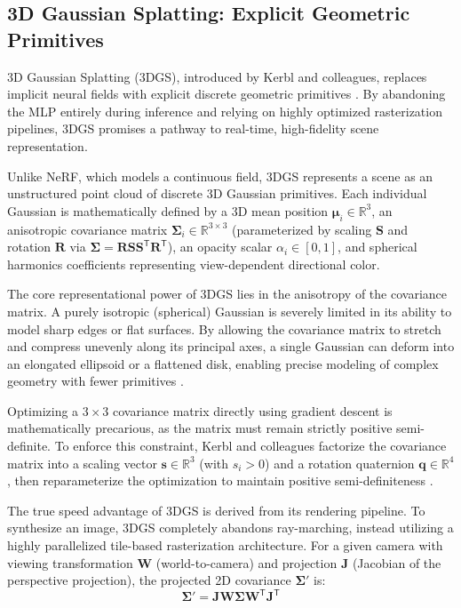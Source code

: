 \documentclass[12pt,a4paper,oneside]{report}
\begin{document}
\subsection{3D Gaussian Splatting: Explicit Geometric Primitives}
\label{subsec:3d_gaussian_splatting_explicit_geometric_primitives}

3D Gaussian Splatting (3DGS), introduced by Kerbl and colleagues, replaces implicit neural fields with explicit discrete geometric primitives \cite{kerbl20233d}. By abandoning the MLP entirely during inference and relying on highly optimized rasterization pipelines, 3DGS promises a pathway to real-time, high-fidelity scene representation.

Unlike NeRF, which models a continuous field, 3DGS represents a scene as an unstructured point cloud of discrete 3D Gaussian primitives. Each individual Gaussian is mathematically defined by a 3D mean position $\boldsymbol{\mu}_i \in \mathbb{R}^3$, an anisotropic covariance matrix $\boldsymbol{\Sigma}_i \in \mathbb{R}^{3 \times 3}$ (parameterized by scaling $\mathbf{S}$ and rotation $\mathbf{R}$ via $\boldsymbol{\Sigma} = \mathbf{R} \mathbf{S} \mathbf{S}^\mathsf{T} \mathbf{R}^\mathsf{T}$), an opacity scalar $\alpha_i \in [0, 1]$, and spherical harmonics coefficients representing view-dependent directional color.

The core representational power of 3DGS lies in the anisotropy of the covariance matrix. A purely isotropic (spherical) Gaussian is severely limited in its ability to model sharp edges or flat surfaces. By allowing the covariance matrix to stretch and compress unevenly along its principal axes, a single Gaussian can deform into an elongated ellipsoid or a flattened disk, enabling precise modeling of complex geometry with fewer primitives \cite{kerbl20233d}.

Optimizing a $3 \times 3$ covariance matrix directly using gradient descent is mathematically precarious, as the matrix must remain strictly positive semi-definite. To enforce this constraint, Kerbl and colleagues factorize the covariance matrix into a scaling vector $\mathbf{s} \in \mathbb{R}^3$ (with $s_i > 0$) and a rotation quaternion $\mathbf{q} \in \mathbb{R}^4$, then reparameterize the optimization to maintain positive semi-definiteness \cite{kerbl20233d}.

The true speed advantage of 3DGS is derived from its rendering pipeline. To synthesize an image, 3DGS completely abandons ray-marching, instead utilizing a highly parallelized tile-based rasterization architecture. For a given camera with viewing transformation $\mathbf{W}$ (world-to-camera) and projection $\mathbf{J}$ (Jacobian of the perspective projection), the projected 2D covariance $\boldsymbol{\Sigma}'$ is:
\begin{equation}\boldsymbol{\Sigma}' = \mathbf{J} \mathbf{W} \boldsymbol{\Sigma} \mathbf{W}^\mathsf{T} \mathbf{J}^\mathsf{T}
\end{equation}
\end{document}
